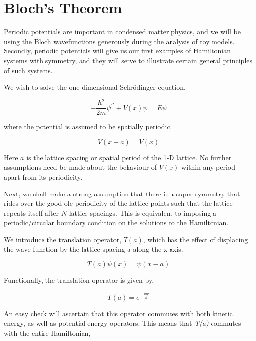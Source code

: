 \chapter{Bloch's Theorem}

Periodic potentials are important in condensed matter physics, and we will be using the Bloch wavefunctions generously during the analysis of toy models. Secondly, periodic potentials will give us our first examples of Hamiltonian systems with symmetry, and they will serve to illustrate certain general principles of such systems. \par

We wish to solve the one-dimensional Schrödinger equation,

\begin{equation*}
    -\frac{\hbar^{2}}{2m}\psi^{\prime \prime} + V(x) \psi = E \psi
\end{equation*}

where the potential is assumed to be spatially periodic,

\begin{equation}
    V(x+a) = V(x)
\end{equation}

Here $a$ is the lattice spacing or spatial period of the 1-D lattice. No further assumptions need be made about the behaviour of $V(x)$ within any period apart from its periodicity. \par
Next, we shall make a strong assumption that there is a super-symmetry that rides over the good ole periodicity of the lattice points such that the lattice repeats itself after $N$ lattice spacings. This is equivalent to imposing a periodic/circular boundary condition on the solutions to the Hamiltonian. \par

We introduce the translation operator, $T(a)$, which has the effect of displacing the wave function by the lattice spacing $a$ along the x-axis. 

\begin{equation}
    T(a) \psi(x) = \psi (x-a)
\end{equation}

Functionally, the translation operator is given by,

\begin{equation}
    T(a) = e^{-\frac{iap}{\hbar}}
\end{equation}

An easy check will ascertain that this operator commutes with both kinetic energy, as well as potential energy operators. This means that \textit{T(a)} commutes with the entire Hamiltonian, 

